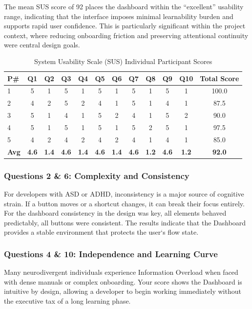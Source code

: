 The mean \gls{SUS} score of 92 places the dashboard within the “excellent” usability range, indicating that the interface imposes minimal learnability 
burden and supports rapid user confidence. This is particularly significant within the project context, where reducing onboarding friction and 
preserving attentional continuity were central design goals.

\begin{table}[H]
\centering
\caption{System Usability Scale (SUS) Individual Participant Scores}
\label{tab:sus_results}
\begin{tabular}{lccccccccccc}
\toprule
\textbf{P\#} & \textbf{Q1} & \textbf{Q2} & \textbf{Q3} & \textbf{Q4} & \textbf{Q5} & \textbf{Q6} & \textbf{Q7} & \textbf{Q8} & \textbf{Q9} & \textbf{Q10} & \textbf{Total Score} \\
\midrule
1 & 5 & 1 & 5 & 1 & 5 & 1 & 5 & 1 & 5 & 1 & 100.0 \\
2 & 4 & 2 & 5 & 2 & 4 & 1 & 5 & 1 & 4 & 1 & 87.5 \\
3 & 5 & 1 & 4 & 1 & 5 & 2 & 4 & 1 & 5 & 2 & 90.0 \\
4 & 5 & 1 & 5 & 1 & 5 & 1 & 5 & 2 & 5 & 1 & 97.5 \\
5 & 4 & 2 & 4 & 2 & 4 & 2 & 4 & 1 & 4 & 1 & 85.0 \\
\midrule
\textbf{Avg} & \textbf{4.6} & \textbf{1.4} & \textbf{4.6} & \textbf{1.4} & \textbf{4.6} & \textbf{1.4} & \textbf{4.6} & \textbf{1.2} & \textbf{4.6} & \textbf{1.2} & \textbf{92.0} \\
\bottomrule
\end{tabular}
\end{table}

\subsubsection{Questions 2 \& 6: Complexity and Consistency} 
For developers with \gls{ASD} or \gls{ADHD}, inconsistency is a major source of cognitive strain. If a button moves or a shortcut changes, it can break their focus
entirely. For the dashboard consistency in the design was key, all elements behaved predictably, all buttons were consistent. The results indicate that the Dashboard 
provides a stable environment that protects the user`s flow state.

\subsubsection{Questions 4 \& 10: Independence and Learning Curve}
Many \gls{neurodivergent} individuals experience Information Overload when faced with dense manuals or complex onboarding. 
Your score shows the Dashboard is intuitive by design, allowing a developer to begin working immediately without the executive tax of a long learning phase.

